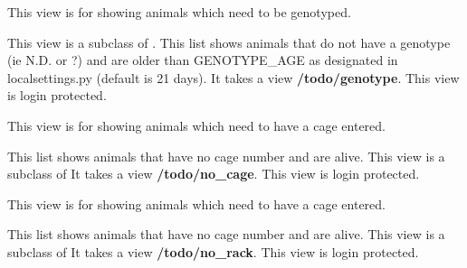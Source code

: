 \documentclass[letterpaper,10pt,english]{sphinxmanual}
\begin{document}

\begin{fulllineitems}
\label{animals:mousedb.animal.views.GenotypeList}
This view is for showing animals which need to be genotyped.

This view is a subclass of {\hyperref[animals:mousedb.animal.views.AnimalList]{}}.
This list shows animals that do not have a genotype (ie N.D. or ?) and are older than GENOTYPE\_AGE as designated in localsettings.py (default is 21 days).
It takes a view \textbf{/todo/genotype}.
This view is login protected.

\end{fulllineitems}


\begin{fulllineitems}
\label{animals:mousedb.animal.views.NoCageList}
This view is for showing animals which need to have a cage entered.

This list shows animals that have no cage number and are alive.
This view is a subclass of {\hyperref[animals:mousedb.animal.views.AnimalList]{}}
It takes a view \textbf{/todo/no\_cage}.
This view is login protected.

\end{fulllineitems}


\begin{fulllineitems}
\label{animals:mousedb.animal.views.NoRackList}
This view is for showing animals which need to have a cage entered.

This list shows animals that have no cage number and are alive.
This view is a subclass of {\hyperref[animals:mousedb.animal.views.AnimalList]{}}
It takes a view \textbf{/todo/no\_rack}.
This view is login protected.

\end{fulllineitems}

\end{document}
